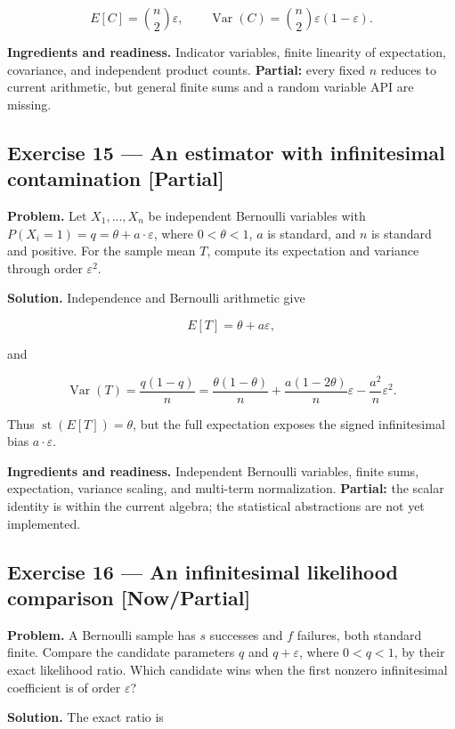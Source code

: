 \documentclass[11pt]{article}
\newcommand{\eps}{\varepsilon}
\renewcommand{\epsilon}{\varepsilon}
\newcommand{\st}{\operatorname{st}}
\begin{document}
\[
E[C]={n\choose2}\epsilon,
\qquad
\operatorname{Var}(C)={n\choose2}\epsilon(1-\epsilon).
\]

\textbf{Ingredients and readiness.} Indicator variables, finite linearity of
expectation, covariance, and independent product counts. \textbf{Partial:} every
fixed $n$ reduces to current arithmetic, but general finite sums and a random
variable API are missing.


\subsection*{Exercise 15 --- An estimator with infinitesimal contamination \hfill \normalfont\small[Partial]}

\textbf{Problem.} Let $X_{1},...,X_{n}$ be independent Bernoulli variables with
$P(X_{i}=1)=q=\theta+a\cdot \eps$, where $0<\theta<1$, $a$ is standard, and $n$ is
standard and positive. For the sample mean $T$, compute its expectation and
variance through order $\eps^2$.

\textbf{Solution.} Independence and Bernoulli arithmetic give

\[
E[T]=\theta+a\epsilon,
\]

and

\[
\operatorname{Var}(T)
=\frac{q(1-q)}n
=\frac{\theta(1-\theta)}n
 +\frac{a(1-2\theta)}n\epsilon
 -\frac{a^2}{n}\epsilon^2.
\]

Thus $\st(E[T])=\theta$, but the full expectation exposes the signed
infinitesimal bias $a\cdot \eps$.

\textbf{Ingredients and readiness.} Independent Bernoulli variables, finite sums,
expectation, variance scaling, and multi-term normalization. \textbf{Partial:} the
scalar identity is within the current algebra; the statistical abstractions
are not yet implemented.


\subsection*{Exercise 16 --- An infinitesimal likelihood comparison \hfill \normalfont\small[Now/Partial]}

\textbf{Problem.} A Bernoulli sample has $s$ successes and $f$ failures, both
standard finite. Compare the candidate parameters $q$ and $q+\eps$, where
$0<q<1$, by their exact likelihood ratio. Which candidate wins when the first
nonzero infinitesimal coefficient is of order $\eps$?

\textbf{Solution.} The exact ratio is
\end{document}
